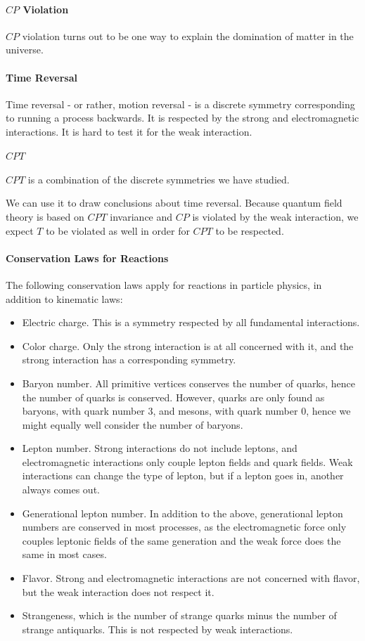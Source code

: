 \paragraph{$CP$ Violation}
$CP$ violation turns out to be one way to explain the domination of matter in the universe.

\paragraph{Time Reversal}
Time reversal - or rather, motion reversal - is a discrete symmetry corresponding to running a process backwards. It is respected by the strong and electromagnetic interactions. It is hard to test it for the weak interaction.

\paragraph{$CPT$}
$CPT$ is a combination of the discrete symmetries we have studied.

We can use it to draw conclusions about time reversal. Because quantum field theory is based on $CPT$ invariance and $CP$ is violated by the weak interaction, we expect $T$ to be violated as well in order for $CPT$ to be respected.

\paragraph{Conservation Laws for Reactions}
The following conservation laws apply for reactions in particle physics, in addition to kinematic laws:
\begin{itemize}
	\item Electric charge. This is a symmetry respected by all fundamental interactions.
	\item Color charge. Only the strong interaction is at all concerned with it, and the strong interaction has a corresponding symmetry.
	\item Baryon number. All primitive vertices conserves the number of quarks, hence the number of quarks is conserved. However, quarks are only found as baryons, with quark number 3, and mesons, with quark number 0, hence we might equally well consider the number of baryons.
	\item Lepton number. Strong interactions do not include leptons, and electromagnetic interactions only couple lepton fields and quark fields. Weak interactions can change the type of lepton, but if a lepton goes in, another always comes out.
	\item Generational lepton number. In addition to the above, generational lepton numbers are conserved in most processes, as the electromagnetic force only couples leptonic fields of the same generation and the weak force does the same in most cases.
	\item Flavor. Strong and electromagnetic interactions are not concerned with flavor, but the weak interaction does not respect it.
	\item Strangeness, which is the number of strange quarks minus the number of strange antiquarks. This is not respected by weak interactions.
\end{itemize}

